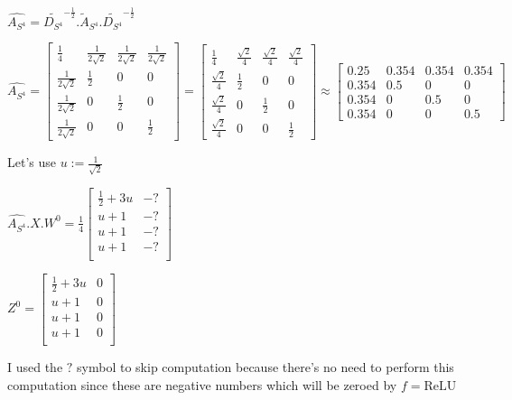 \documentclass[a4paper]{article}
\begin{document}
$\hat{A_{S^4}} = \tilde{D_{S^4}}^{-\frac{1}{2}} .\tilde{A}_{S^4} .\tilde{D_{S^4}}^{-\frac{1}{2}} $





$\hat{A_{S^4}} = \begin{bmatrix}
    \frac{1}{4} &  \frac{1}{2\sqrt{2}}  &  \frac{1}{2\sqrt{2}}  &  \frac{1}{2\sqrt{2}} \\
    \frac{1}{2\sqrt{2}}  &  \frac{1}{2}  &  0 &  0\\
    \frac{1}{2\sqrt{2}}  &  0 &  \frac{1}{2}  &  0\\
    \frac{1}{2\sqrt{2}}  &  0 &  0 &  \frac{1}{2} 
\end{bmatrix} =
\left[\begin{matrix}\frac{1}{4} & \frac{\sqrt{2}}{4} & \frac{\sqrt{2}}{4} & \frac{\sqrt{2}}{4}\\\frac{\sqrt{2}}{4} & \frac{1}{2} & 0 & 0\\\frac{\sqrt{2}}{4} & 0 & \frac{1}{2} & 0\\\frac{\sqrt{2}}{4} & 0 & 0 & \frac{1}{2}\end{matrix}\right]
\approx \begin{bmatrix}
    0.25 &  0.354 &  0.354 &  0.354\\
    0.354 &  0.5 &  0 &  0\\
    0.354 &  0 &  0.5 &  0\\
    0.354 &  0 &  0 &  0.5
\end{bmatrix}
$

Let's use $u := \frac{1}{\sqrt{2}}$

$\hat{A_{S^4}}.X. W^{0} = \frac{1}{4}\begin{bmatrix}
    \frac{1}{2} + 3u &  -? \\
    u+1 &  -? \\
    u+1 &  -? \\
    u+1 &  -? \\
\end{bmatrix}$

$Z^{0} = \begin{bmatrix}
    \frac{1}{2} + 3u & 0 \\
    u+1 &  0 \\
    u+1 &  0 \\
    u+1 &  0 \\
\end{bmatrix}
$


I used the $?$ symbol to skip computation because there's no need to perform this computation since these are negative numbers
which will be zeroed by $f=\text{ReLU}$
\end{document}
